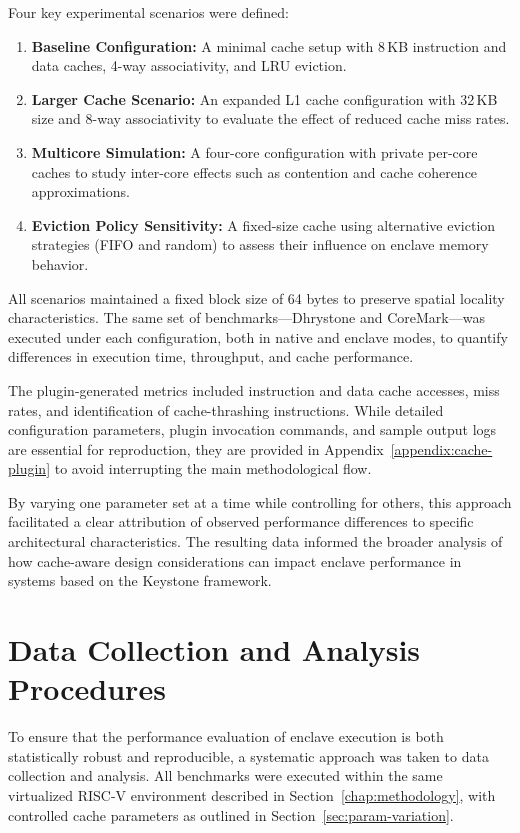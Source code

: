 Four key experimental scenarios were defined:

\begin{enumerate}
    \item \textbf{Baseline Configuration:} A minimal cache setup with 8\,KB instruction and data caches, 4-way associativity, and LRU eviction.
    \item \textbf{Larger Cache Scenario:} An expanded L1 cache configuration with 32\,KB size and 8-way associativity to evaluate the effect of reduced cache miss rates.
    \item \textbf{Multicore Simulation:} A four-core configuration with private per-core caches to study inter-core effects such as contention and cache coherence approximations.
    \item \textbf{Eviction Policy Sensitivity:} A fixed-size cache using alternative eviction strategies (FIFO and random) to assess their influence on enclave memory behavior.
\end{enumerate}

All scenarios maintained a fixed block size of 64 bytes to preserve spatial locality characteristics. The same set of benchmarks—Dhrystone and CoreMark—was executed under each configuration, both in native and enclave modes, to quantify differences in execution time, throughput, and cache performance.

The plugin-generated metrics included instruction and data cache accesses, miss rates, and identification of cache-thrashing instructions. While detailed configuration parameters, plugin invocation commands, and sample output logs are essential for reproduction, they are provided in Appendix~\ref{appendix:cache-plugin} to avoid interrupting the main methodological flow.

By varying one parameter set at a time while controlling for others, this approach facilitated a clear attribution of observed performance differences to specific architectural characteristics. The resulting data informed the broader analysis of how cache-aware design considerations can impact enclave performance in systems based on the Keystone framework.

\section{Data Collection and Analysis Procedures}
\label{sec:data-collection}

To ensure that the performance evaluation of enclave execution is both statistically robust and reproducible, a systematic approach was taken to data collection and analysis. All benchmarks were executed within the same virtualized RISC-V environment described in Section~\ref{chap:methodology}, with controlled cache parameters as outlined in Section~\ref{sec:param-variation}.

